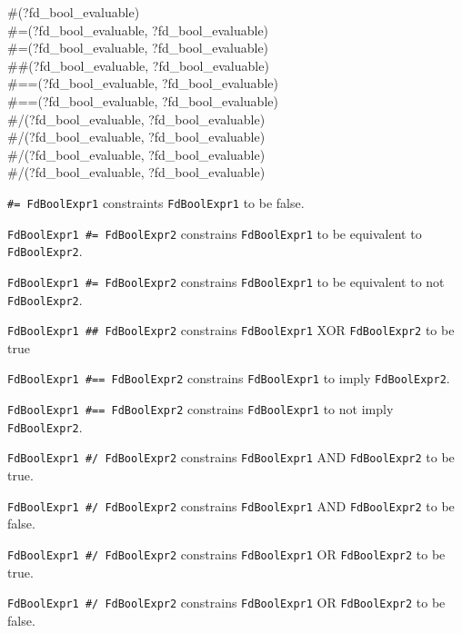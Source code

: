\begin{TemplatesOneCol}
\#{\bs}(?fd\_bool\_evaluable)\\
\#{\lt}={\gt}(?fd\_bool\_evaluable, ?fd\_bool\_evaluable)\\
\#{\bs}{\lt}={\gt}(?fd\_bool\_evaluable, ?fd\_bool\_evaluable)\\
\#\#(?fd\_bool\_evaluable, ?fd\_bool\_evaluable)\\
\#=={\gt}(?fd\_bool\_evaluable, ?fd\_bool\_evaluable)\\
\#{\bs}=={\gt}(?fd\_bool\_evaluable, ?fd\_bool\_evaluable)\\
\#/{\bs}(?fd\_bool\_evaluable, ?fd\_bool\_evaluable)\\
\#{\bs}/{\bs}(?fd\_bool\_evaluable, ?fd\_bool\_evaluable)\\
\#{\bs}/(?fd\_bool\_evaluable, ?fd\_bool\_evaluable)\\
\#{\bs}{\bs}/(?fd\_bool\_evaluable, ?fd\_bool\_evaluable)

\end{TemplatesOneCol}

\Description

\texttt{\#{\bs}= FdBoolExpr1} constraints \texttt{FdBoolExpr1} to be
false.

\texttt{FdBoolExpr1 \#{\lt}={\gt} FdBoolExpr2} constrains
\texttt{FdBoolExpr1} to be equivalent to \texttt{FdBoolExpr2}.

\texttt{FdBoolExpr1 \#{\bs}{\lt}={\gt} FdBoolExpr2} constrains
\texttt{FdBoolExpr1} to be equivalent to not \texttt{FdBoolExpr2}.

\texttt{FdBoolExpr1 \#\# FdBoolExpr2} constrains \texttt{FdBoolExpr1} XOR
\texttt{FdBoolExpr2} to be true

\texttt{FdBoolExpr1 \#=={\gt} FdBoolExpr2} constrains
\texttt{FdBoolExpr1} to imply \texttt{FdBoolExpr2}.

\texttt{FdBoolExpr1 \#{\bs}=={\gt} FdBoolExpr2} constrains
\texttt{FdBoolExpr1} to not imply \texttt{FdBoolExpr2}.

\texttt{FdBoolExpr1 \#/{\bs} FdBoolExpr2} constrains \texttt{FdBoolExpr1}
AND \texttt{FdBoolExpr2} to be true.

\texttt{FdBoolExpr1 \#{\bs}/{\bs} FdBoolExpr2} constrains
\texttt{FdBoolExpr1} AND \texttt{FdBoolExpr2} to be false.

\texttt{FdBoolExpr1 \#{\bs}/ FdBoolExpr2} constrains \texttt{FdBoolExpr1}
OR \texttt{FdBoolExpr2} to be true.

\texttt{FdBoolExpr1 \#{\bs}{\bs}/ FdBoolExpr2} constrains
\texttt{FdBoolExpr1} OR \texttt{FdBoolExpr2} to be false.


